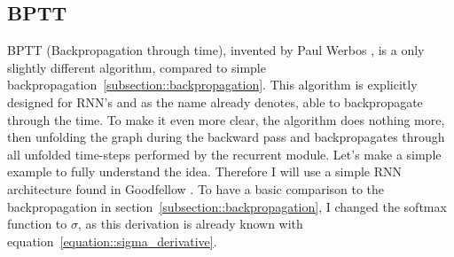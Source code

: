  \subsection{BPTT} \label{subsection::bptt}
  BPTT (Backpropagation through time), invented by Paul Werbos \cite{Werbos1990}, is a only slightly different algorithm, compared to simple backpropagation~\ref{subsection::backpropagation}.
  This algorithm is explicitly designed for RNN's and as the name already denotes, able to backpropagate through the time. To make it even more clear, the algorithm does nothing more, then
  unfolding the graph during the backward pass and backpropagates through all unfolded time-steps performed by the recurrent module. Let's make a simple example to fully understand the idea.
  Therefore I will use a simple RNN architecture found in Goodfellow \cite{Goodfellow2016}. To have a basic comparison to the backpropagation in section~\ref{subsection::backpropagation}, I changed
  the softmax function to $\sigma$, as this derivation is already known with equation~\ref{equation::sigma_derivative}.
